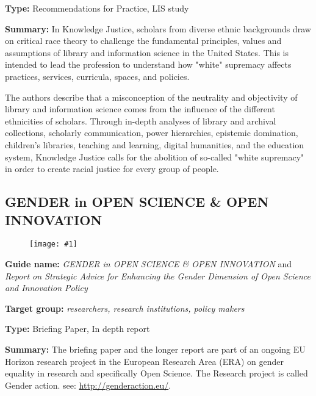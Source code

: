 \documentclass{article}
\newlength{\imgwidth}
\newcommand\scaledgraphics[2]{%
                
\settowidth{\imgwidth}{\texttt{[image: \#1]}}%
                
\setlength{\imgwidth}{\minof{\imgwidth}{#2\textwidth}}%
                
\texttt{[image: \#1]}%
                
}
\begin{document}
\textbf{Type:} Recommendations for Practice, LIS study


\textbf{Summary: }In Knowledge Justice, scholars from diverse ethnic backgrounds draw on critical race theory to challenge the fundamental principles, values and assumptions of library and information science in the United States. This is intended to lead the profession to understand how "white" supremacy affects practices, services, curricula, spaces, and policies.


The authors describe that a misconception of the neutrality and objectivity of library and information science comes from the influence of the different ethnicities of scholars. Through in-depth analyses of library and archival collections, scholarly communication, power hierarchies, epistemic domination, children's libraries, teaching and learning, digital humanities, and the education system, Knowledge Justice calls for the abolition of so-called "white supremacy" in order to create racial justice for every group of people.


\subsection{GENDER in OPEN SCIENCE \& OPEN INNOVATION}\label{H6993921}



\begin{center}
\begin{figure}
\scaledgraphics{59987ee5-bc7e-4c52-98de-ba70e420a252.jpg}{0.5}
\label{F24284111}
\end{figure}


\end{center}


\textbf{Guide name: }\emph{GENDER in OPEN SCIENCE \& OPEN INNOVATION}\textbf{ }\autocite{gender_action_gender_2018} and \emph{Report on Strategic Advice for Enhancing the Gender Dimension of Open Science and Innovation Policy} \autocite{institute_of_sociology_report_2019}


\textbf{Target group:} \emph{researchers, research institutions, policy makers}


\textbf{Type: }Briefing Paper, In depth report


\textbf{Summary: }The briefing paper and the longer report are part of an ongoing EU Horizon research project in the European Research Area (ERA) on gender equality in research and specifically Open Science. The Research project is called Gender action. see: \href{http://genderaction.eu/}{http://genderaction.eu/}.
\end{document}
